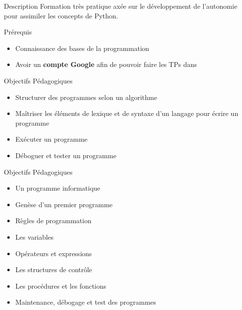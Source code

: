\begin{frame}{Description}
  Formation très pratique axée sur le développement de l'autonomie pour assimiler les concepts de Python.
\end{frame}

\begin{frame}{Prérequis}
  \begin{itemize}
  \item Connaissance des bases de la programmation
  \item Avoir un \textbf{compte Google} afin de pouvoir faire les TPs dans 
  \end{itemize}
\end{frame}

\begin{frame}{Objectifs Pédagogiques}
  \begin{itemize}
    \item  Structurer des programmes selon un algorithme
    \item  Maîtriser les éléments de lexique et de syntaxe d'un langage pour écrire un programme
    \item  Exécuter un programme
    \item  Déboguer et tester un programme
  \end{itemize}
\end{frame}

\begin{frame}{Objectifs Pédagogiques}
  \begin{itemize} 
    \item Un programme informatique
    \item Genèse d'un premier programme
    \item Règles de programmation
    \item Les variables
    \item Opérateurs et expressions
    \item Les structures de contrôle
    \item Les procédures et les fonctions
    \item Maintenance, débogage et test des programmes 
  \end{itemize}
\end{frame}


